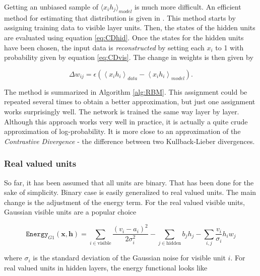 Getting an unbiased sample of $ \langle x_ih_j \rangle_{model}$ is much more difficult. An efficient method for estimating that distribution is given in \cite{Hinton2002}. This method starts by assigning training data to visible layer units. Then, the states of the hidden units are evaluated using equation \ref{eq:CDhid}. Once the states for the hidden units have been chosen, the input data is \textit{reconstructed} by setting each $x_i$ to 1 with probability given by equation \ref{eq:CDvis}. The change in weights is then given by 

\begin{equation}
	\Delta w_{ij} = \epsilon \left (  \left \langle x_ih_i   \right \rangle_{data} - \left \langle x_ih_i   \right \rangle_{model}   \right ).
\end{equation}

The method is summarized in Algorithm \ref{alg:RBM}. This assignment could be repeated several times to obtain a better approximation, but just one assignment works surprisingly well. The network is trained the same way layer by layer. \\

Although this approach works very well in practice, it is actually a quite crude approximation of  log-probability. It is more close to an approximation of the \textit{Contrastive Divergence} - the difference between two Kullback-Lieber divergences. \\

\subsubsection{Real valued units}

So far, it has been assumed that all units are binary. That has been done for the sake of simplicity. Binary case is easily generalized to real valued units. The main change is the adjustment of the energy term. For the real valued visible units, Gaussian visible units are a popular choice

\begin{equation}
	\mathtt{Energy}_{G1}(\mathbf{x}, \mathbf{h}) = \sum_{i \in \text{visible}}\frac{(v_i - a_i)^2}{2\sigma_i^2} - \sum_{j \in \text{hidden}} b_jh_j - \sum_{i,j}\frac{v_i}{\sigma_i}h_iw_j
\end{equation}

where $\sigma_i$ is the standard deviation of the Gaussian noise for visible unit $i$. For real valued units in hidden layers, the energy functional looks like

